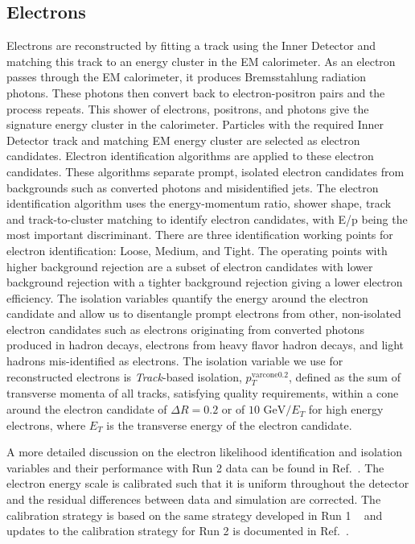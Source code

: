 \subsection{Electrons}
Electrons are reconstructed by fitting a track using the Inner Detector and matching this track to an energy cluster in the EM calorimeter\cite{Tarna:2286383}. As an electron passes through the EM calorimeter, it produces Bremsstahlung radiation photons. These photons then convert back to electron-positron pairs and the process repeats. This shower of electrons, positrons, and photons give the signature energy cluster in the calorimeter. Particles with the required Inner Detector track and matching EM energy cluster are selected as electron candidates.\newline
\indent Electron identification algorithms are applied to these electron candidates. These algorithms separate prompt, isolated electron candidates from backgrounds such as converted photons and misidentified jets. The electron identification algorithm uses the energy-momentum ratio, shower shape, track and track-to-cluster matching to identify electron candidates, with E/p being the most important discriminant. There are three identification working points for electron identification: Loose, Medium, and Tight. The operating points with higher background rejection are a subset of electron candidates with lower background rejection with a tighter background rejection giving a lower electron efficiency. \newline
The isolation variables quantify the energy around the electron candidate and allow us to disentangle prompt electrons 
from other, non-isolated electron candidates such as electrons originating 
from converted photons produced in hadron decays, electrons from heavy flavor hadron decays, 
and light hadrons mis-identified as electrons. The isolation variable we use for reconstructed electrons 
is \textit{Track}-based isolation, ${p_{T}^{\mathrm{varcone0.2}}}$, defined as the sum of transverse momenta
of all tracks, satisfying quality requirements, within a cone around the electron candidate of ${\Delta R = 0.2}$ or of ${10\text{ GeV}/E_{T}}$ for high energy electrons, where $E_{T}$ is the transverse energy of the electron candidate.

A more detailed discussion on the electron likelihood identification and isolation variables 
and their performance with Run 2 data can be found in Ref.~\cite{ATLAS-CONF-2016-024}. 
The electron energy scale is calibrated such that it is uniform throughout the detector and the residual differences
between data and simulation are corrected. The calibration strategy is based on the same strategy developed 
in Run 1 ~\cite{ATLAS-EGAMMACALIB-RUN1} and updates to the calibration strategy for Run 2 is 
documented in Ref.~\cite{ATL-PHYS-PUB-2016-015}.
